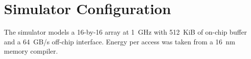 \chapter{Simulator Configuration}
\label{app:a}

The simulator models a 16-by-16 array at 1~GHz with 512~KiB of on-chip buffer and a 64~GB/s
off-chip interface. Energy per access was taken from a 16~nm memory compiler.

